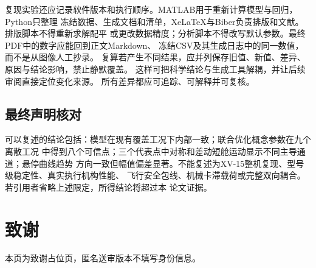 \documentclass[UTF8,12pt,oneside,openany,fontset=windows]{ctexbook}
\begin{document}
复现实验还应记录软件版本和执行顺序。MATLAB用于重新计算模型与回归，Python只整理 冻结数据、生成文档和清单，XeLaTeX与Biber负责排版和文献。排版脚本不得重新求解配平 或更改数据精度；分析脚本不得改写默认参数。最终PDF中的数字应能回到正文Markdown、 冻结CSV及其生成日志中的同一数值，而不是从图像人工抄录。 复算若产生不同结果，应并列保存旧值、新值、差异、原因与结论影响，禁止静默覆盖。 这样可把科学结论与生成工具解耦，并让后续审阅直接定位变化来源。 所有差异都应可追踪、可解释并可复核。

\section{最终声明核对}

可以复述的结论包括：模型在现有覆盖工况下内部一致；联合优化概念参数在九个离散工况 中得到八个可信点；三个代表点中对称和差动短舱运动显示不同主导通道；悬停曲线趋势 方向一致但幅值偏差显著。不能复述为XV-15整机复现、型号级稳定性、真实执行机构性能、 飞行安全包线、机械卡滞载荷或完整双向耦合。若引用者省略上述限定，所得结论将超过本 论文证据。

\backmatter
\printbibliography[heading=bibintoc,title={参考文献}]
\chapter*{致谢}
本页为致谢占位页，匿名送审版本不填写身份信息。
\end{document}
